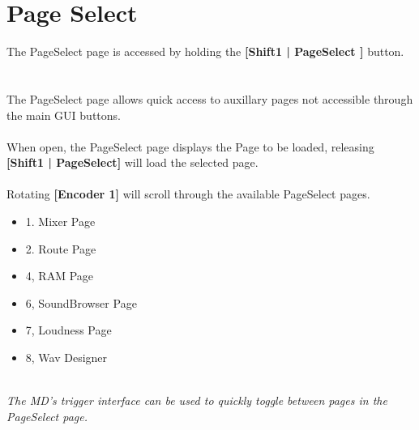 \chapter{Page Select}
The PageSelect page is accessed by holding the \textbf{[Shift1 | PageSelect ]} button.
\\
\\
\\
The PageSelect page allows quick access to auxillary pages not accessible through the main GUI buttons.\\
\\
When open, the PageSelect page displays the Page to be loaded, releasing \textbf{[Shift1 | PageSelect]} will load
the selected page.
\\
\\Rotating \textbf{[Encoder 1]} will scroll through the available PageSelect pages.
\begin{itemize}
	\item{1. Mixer Page}
	\item{2. Route Page}
	\item{4, RAM Page}
	\item{6, SoundBrowser Page}
	\item{7, Loudness Page}
    \item{8, Wav Designer}
\end{itemize}
\\
\textit{The MD's trigger interface can be used to quickly toggle between pages in the PageSelect page. }






